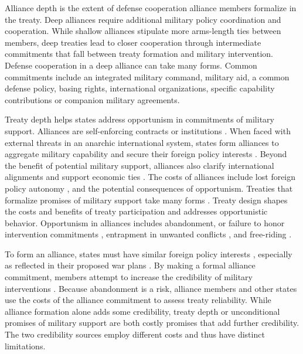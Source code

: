 \documentclass[12pt]{article}
\begin{document}
Alliance depth is the extent of defense cooperation alliance members formalize in the treaty. 
Deep alliances require additional military policy coordination and cooperation. 
While shallow alliances stipulate more arms-length ties between members, deep treaties lead to closer cooperation through intermediate commitments that fall between treaty formation and military intervention. 
Defense cooperation in a deep alliance can take many forms. 
Common commitments include an integrated military command, military aid, a common defense policy, basing rights, international organizations, specific capability contributions or companion military agreements. 


Treaty depth helps states address opportunism in commitments of military support.
Alliances are self-enforcing contracts or institutions \citep{Leedsetal2002, Morrow2000}.
When faced with external threats in an anarchic international system, states form alliances to aggregate military capability and secure their foreign policy interests \citep{Altfield1984, Smith1995, Snyder1997, FordhamPoast2014}.
Beyond the benefit of potential military support, alliances also clarify international alignments \citep{Snyder1990} and support economic ties \citep{Gowa1995, Li2003, Long2003, Fordham2010, WolfordKim2017}.  
The costs of alliances include lost foreign policy autonomy \citep{Altfield1984, Morrow2000, Johnson2015}, and the potential consequences of opportunism. 
Treaties that formalize promises of military support take many forms \citep{Leedsetal2000, Leedsetal2002, Benson2012, BensonClinton2016}. 
Treaty design shapes the costs and benefits of treaty participation and addresses opportunistic behavior. 
Opportunism in alliances includes abandonment, or failure to honor intervention commitments \citep{Leeds2003a, BerkemeierFuhrmann2018}, entrapment in unwanted conflicts \citep{Snyder1984}, and free-riding \citep{Morrow2000}.   


To form an alliance, states must have similar foreign policy interests \citep{Morrow1991, Smith1995, FordhamPoast2014}, especially as reflected in their proposed war plans \citep{Poast2019a}. 
By making a formal alliance commitment, members attempt to increase the credibility of military interventions \citep{Morrow2000}. 
Because abandonment is a risk, alliance members and other states use the costs of the alliance commitment to assess treaty reliability. 
While alliance formation alone adds some credibility, treaty depth or unconditional promises of military support are both costly promises that add further credibility.  
The two credibility sources employ different costs and thus have distinct limitations.  
\end{document}
